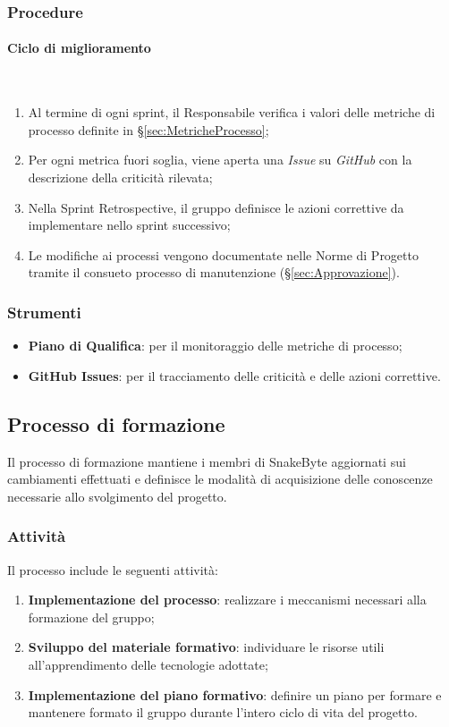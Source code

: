 \documentclass[10pt, letterpaper]{article}
\newcommand{\trisubsection}[1]{\paragraph{#1}\mbox{}\\}
\begin{document}
\subsubsection{Procedure}

\trisubsection{Ciclo di miglioramento}
\begin{enumerate}
    \item Al termine di ogni sprint, il Responsabile verifica i valori delle metriche di processo definite in §\ref{sec:MetricheProcesso};
    \item Per ogni metrica fuori soglia, viene aperta una \textit{Issue} su \textit{GitHub} con la descrizione della criticità rilevata;
    \item Nella Sprint Retrospective, il gruppo definisce le azioni correttive da implementare nello sprint successivo;
    \item Le modifiche ai processi vengono documentate nelle Norme di Progetto tramite il consueto processo di manutenzione (§\ref{sec:Approvazione}).
\end{enumerate}

\subsubsection{Strumenti}
\begin{itemize}
    \item \textbf{Piano di Qualifica}: per il monitoraggio delle metriche di processo;
    \item \textbf{GitHub Issues}: per il tracciamento delle criticità e delle azioni correttive.
\end{itemize}


\subsection{Processo di formazione}
Il processo di formazione mantiene i membri di SnakeByte aggiornati sui cambiamenti effettuati e definisce le modalità di acquisizione delle conoscenze necessarie allo svolgimento del progetto.

\subsubsection{Attività}
Il processo include le seguenti attività:
\begin{enumerate}
    \item \textbf{Implementazione del processo}: realizzare i meccanismi necessari alla formazione del gruppo;
    \item \textbf{Sviluppo del materiale formativo}: individuare le risorse utili all'apprendimento delle tecnologie adottate;
    \item \textbf{Implementazione del piano formativo}: definire un piano per formare e mantenere formato il gruppo durante l'intero ciclo di vita del progetto.
\end{enumerate}
\end{document}
